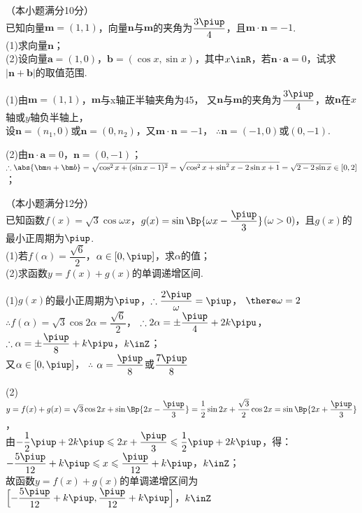 \begin{exercise}
    （本小题满分10分）\\
    已知向量$\bm m=(1,1)$，向量$\bm n$与$\bm m$的夹角为$\dfrac{3\piup}4$，且$\bm m\cdot\bm n=-1$.\\
    (1)求向量$\bm n$；\\
    (2)设向量$\bm a=(1,0)$，$\bm b=(\cos x,\sin x)$，其中$x\inR$，若$\bm n\cdot\bm a=0$，试求$|\bm n+\bm b|$的取值范围.
    \begin{answer}
      (1)由$\bm m=(1,1)$，$\bm m$与x轴正半轴夹角为45\degree，
        又$\bm n$与$\bm m$的夹角为$\dfrac{3\piup}4$，故$\bm n$在$x$轴或$y$轴负半轴上，\\
        设$\bm n=(n_1,0)$或$\bm n=(0,n_2)$，又$\bm m\cdot\bm n=-1$，
        $\therefore \bm n=(-1,0)$或$(0,-1)$.\par
      (2)由$\bm n\cdot\bm a=0$，$\bm n=(0,-1)$；
        $\therefore \abs{\bm n+\bm b}=\sqrt{\cos^2x+(\sin{x}-1)^2}
        =\sqrt{\cos^2x+\sin^2x-2\sin x+1}=\sqrt{2-2\sin x} \in[0,2]$；
    \end{answer}
  \vspace{5em}
  \item
    （本小题满分12分）\\
    已知函数$f(x)=\sqrt3\cos{\omega x}$，$g(x)=\sin\Bp{\omega x-\dfrac{\piup}3}$($\omega>0$)，且$g(x)$的最小正周期为$\piup$.\\
    (1)若$f(\alpha)=\dfrac{\sqrt6}2$，$\alpha\in[0,\piup]$，求$\alpha$的值；\\
    (2)求函数$y=f(x)+g(x)$的单调递增区间.
    \begin{answer}
      (1)$g(x)$的最小正周期为$\piup$，$\therefore \dfrac{2\piup}{\omega}=\piup$，
        $\there \omega=2$\\
        $\therefore f(\alpha)=\sqrt3\cos{2\alpha}=\dfrac{\sqrt6}2$，
        $\therefore 2\alpha=\pm\dfrac{\piup}4+2k\pipu$，
        $\therefore \alpha=\pm\dfrac{\piup}8+k\pipu$，$k\inZ$；\\
        又$\alpha\in[0,\piup]$，
        $\therefore$ $\alpha=\dfrac{\piup}8$或$\dfrac{7\piup}8$\par
      (2)$y=f(x)+g(x)=\sqrt3\cos{2x}+\sin\Bp{2x-\dfrac{\piup}3}
          =\dfrac12\sin{2x}+\dfrac{\sqrt3}2\cos{2x}=\sin\Bp{2x+\dfrac{\piup}3}$，\\
          由$-\dfrac12\piup+2k\piup \leqslant 2x+\dfrac{\piup}3 \leqslant \dfrac12\piup+2k\piup$，得：
          $-\dfrac{5\piup}{12}+k\piup \leqslant x \leqslant \dfrac{\piup}{12}+k\piup$，$k\inZ$；\\
          故函数$y=f(x)+g(x)$的单调递增区间为
          $\Bigl[-\dfrac{5\piup}{12}+k\piup,\dfrac{\piup}{12}+k\piup\Bigr]$，$k\inZ$
    \end{answer}
  \vspace{4em}
\newpage
\vspace{-3em}

\end{exercise}
